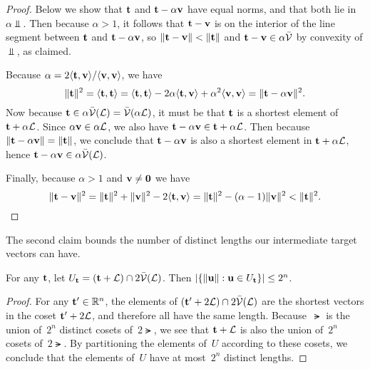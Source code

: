 \documentclass[11pt]{article}
\begin{document}
\begin{proof}
  Below we show that $\vect$ and $\vect-\alpha \vecv$ have equal
  norms, and that both lie in $\alpha \Vbar$. Then because
  $\alpha > 1$, it follows that $\vect-\vecv$ is on the interior of
  the line segment between $\vect$ and $\vect - \alpha \vecv$, so
  $\length{\vect - \vecv} < \length{\vect}$ and
  $\vect - \vecv \in \alpha \Vbar$ by convexity of $\Vbar$, as
  claimed.

  Because $\alpha = 2 \inner{\vect, \vecv}/\inner{\vecv, \vecv}$, we
  have
  \begin{equation}
    \length{\vect}^{2} = \inner{\vect,\vect} =
    \inner{\vect, \vect} - 2 \alpha \inner{\vect, \vecv} + \alpha^{2} \inner{\vecv, \vecv}
    = \length{\vect- \alpha \vecv}^{2}. 
  \end{equation}
  Now because $\vect \in \alpha \Vbar(\lat) = \Vbar(\alpha \lat)$, it
  must be that $\vect$ is a shortest element of $\vect + \alpha\lat$.
  Since $\alpha \vecv \in \alpha \lat$, we also have
  $\vect - \alpha \vecv \in \vect + \alpha \lat$. Then because
  $\length{\vect - \alpha \vecv} = \length{\vect}$, we conclude that
  $\vect-\alpha\vecv$ is also a shortest element in
  $\vect + \alpha \lat$, hence
  $\vect-\alpha \vecv \in \alpha \Vbar(\lat)$.

  Finally, because $\alpha > 1$ and $\vecv \neq \veczero$ we have
  \[\length{\vect-\vecv}^{2} = \length{\vect}^2 + \length{\vecv}^2 - 2
    \inner{\vect, \vecv} = \length{\vect}^2 - (\alpha-1)
    \length{\vecv}^2 < \length{\vect}^2. \]
\end{proof}

\noindent
The second claim bounds the number of distinct lengths our
intermediate target vectors can have.

\begin{claim}
  \label{clm:distinct-lengths}
  For any $\vect$, let $U_{\vect} = (\vect + \lat) \cap 2\Vbar(\lat)$.
  Then
  $\abs*{ \set*{ \length{\vecu} : \vecu \in U_{\vect}}} \leq 2^n$.
\end{claim}

\begin{proof}
  For any $\vect' \in \R^n$, the elements of
  $(\vect' + 2\lat) \cap 2\Vbar (\lat)$ are the shortest vectors in
  the coset $\vect' + 2\lat$, and therefore all have the same length.
  Because~$\lat$ is the union of~$2^{n}$ distinct cosets of~$2\lat$,
  we see that $\vect + \lat$ is also the union of~$2^n$ cosets
  of~$2\lat$. By partitioning the elements of~$U$ according to these
  cosets, we conclude that the elements of~$U$ have at most~$2^n$
  distinct lengths.
\end{proof}
\end{document}
